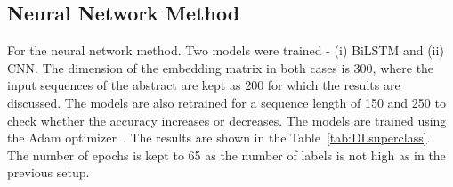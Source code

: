 \begin{table}[!htb]
    \centering
    \caption{Results of predicting super class using Bag of words feature selection}
    \label{tab:resultsBOW}
\end{table}

\subsection{Neural Network Method}
For the neural network method.  Two models were trained - (i) BiLSTM and (ii)
CNN. The dimension of the embedding matrix in both cases is 300, where the input sequences of the abstract
are kept as 200 for which the results are discussed. The models are also retrained
for a sequence length of 150 and 250 to check whether the accuracy increases or
decreases. The models are trained using the Adam optimizer~\cite{kingma2014adam}. The results are shown in the Table~\ref{tab:DLsuperclass}. The number of epochs is kept to 65 as the number of labels is not high as in the previous setup. 

